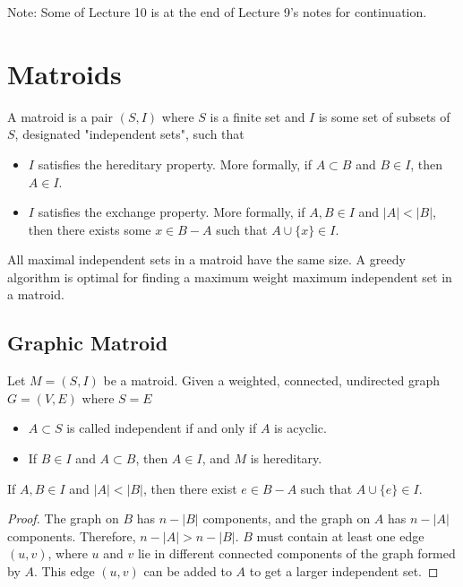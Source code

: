 
Note: Some of Lecture 10 is at the end of Lecture 9's notes for
continuation.

\section{Matroids}

\begin{definition}
    A matroid is a pair $(S, I)$ where $S$ is a finite set and 
    $I$ is some set of subsets of $S$, designated
        "independent sets", such that
    \begin{itemize}
        \item $I$ satisfies the hereditary property. More formally, 
        if $A \subset B$ and $B \in I$, then $A \in I$.
        \item $I$ satisfies the exchange property. More formally,
        if $A, B \in I$ and $|A| < |B|$, then there exists some
        $x \in B - A$ such that $A \cup \{x\} \in I$.
    \end{itemize}
\end{definition}

All maximal independent sets in a matroid have the same size. A greedy
algorithm is optimal for finding a maximum weight maximum independent
set in a matroid.

\subsection{Graphic Matroid}

Let $M = (S, I)$ be a matroid. Given a weighted, connected, undirected
graph $G = (V, E)$ where $S = E$
\begin{itemize}
    \item $A \subset S$ is called independent if and only if $A$ is
    acyclic.
    \item If $B \in I$ and $A \subset B$, then $A \in I$, and $M$ is
    hereditary.
\end{itemize}

\begin{lemma}
    If $A, B \in I$ and $|A| < |B|$, then there exist $e \in B - A$
    such that $A \cup \{e\} \in I$.
\end{lemma}

\begin{proof}
    The graph on $B$ has $n - |B|$ components, and the graph on
    $A$ has $n - |A|$ components. Therefore, $n - |A| > n - |B|$.
    $B$ must contain at least one edge $(u, v)$, where $u$ and
    $v$ lie in different connected components of the graph formed by
    $A$. This edge $(u, v)$ can be added to $A$ to get a larger
    independent set.
\end{proof}

